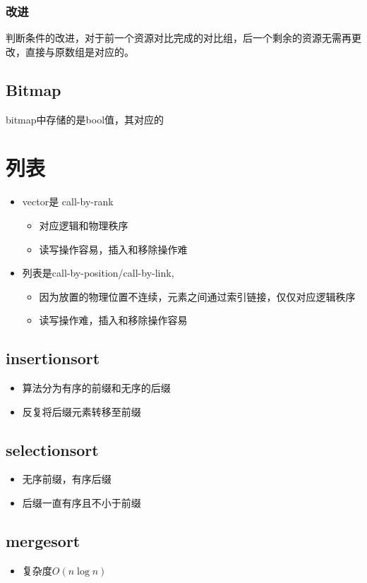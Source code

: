 \subsection{改进}
判断条件的改进，对于前一个资源对比完成的对比组，后一个剩余的资源无需再更改，直接与原数组是对应的。

\section{Bitmap}
bitmap中存储的是bool值，其对应的


\chapter{列表}
\begin{itemize}
\item vector是 call-by-rank
\begin{itemize}
\item 对应逻辑和物理秩序
\item 读写操作容易，插入和移除操作难
\end{itemize}
\item 列表是call-by-position/call-by-link, 
\begin{itemize}
\item 因为放置的物理位置不连续，元素之间通过索引链接，仅仅对应逻辑秩序
\item 读写操作难，插入和移除操作容易
\end{itemize}
\end{itemize}

\section{insertionsort}
\begin{itemize}
\item 算法分为有序的前缀和无序的后缀
\item 反复将后缀元素转移至前缀
\end{itemize}

\section{selectionsort}
\begin{itemize}
\item 无序前缀，有序后缀
\item 后缀一直有序且不小于前缀
\end{itemize}

\section{mergesort}
\begin{itemize}
\item 复杂度$O(n \log n)$
\end{itemize}

